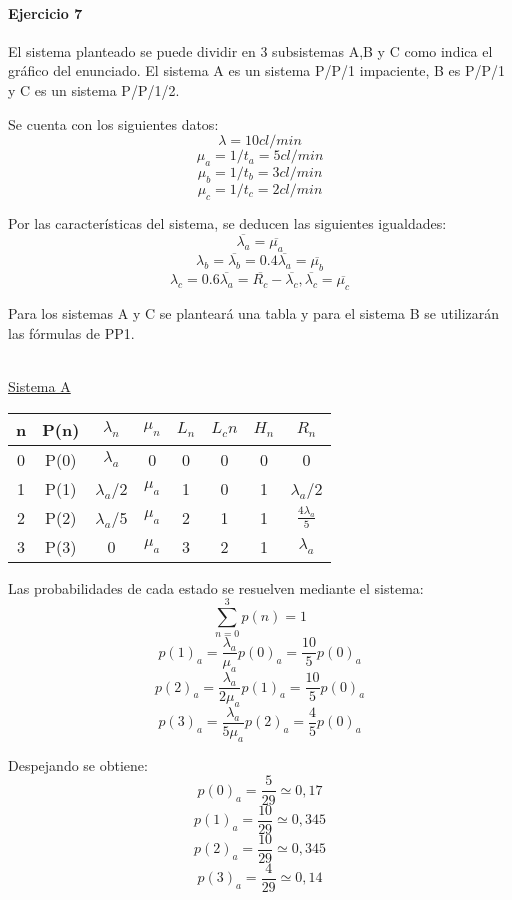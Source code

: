 \documentclass{article}
\begin{document}
\paragraph{Ejercicio 7}
  El sistema planteado se puede dividir en 3 subsistemas A,B y C como indica el gráfico del enunciado. 
  El sistema A es un sistema P/P/1 impaciente, B es P/P/1 y C es un sistema P/P/1/2.
  
  Se cuenta con los siguientes datos: \\
  $$ \lambda = 10 cl/min $$
  $$ \mu_a = 1/t_a = 5 cl/min $$
  $$ \mu_b = 1/t_b = 3 cl/min $$
  $$ \mu_c = 1/t_c = 2 cl/min $$
 
  Por las características del sistema, se deducen las siguientes igualdades: \\
  $$ \overline{\lambda_a} = \overline{\mu_a}$$
  $$ \lambda_b = \overline{\lambda_b} = 0.4 \overline{\lambda_a} = \overline{\mu_b}$$
  $$ \lambda_c = 0.6 \overline{\lambda_a} = \overline{R_c} - \overline{\lambda_c} , \overline{\lambda_c} = \overline{\mu_c}$$
  
 Para los sistemas A y C se planteará una tabla y para el sistema B se utilizarán las fórmulas de PP1. \\ \\

 \begin{center}
  \underline{Sistema A} \\ 
    \begin{tabular}{|| c | c | c | c | c | c | c | c ||}
    \hline 
     n & P(n) & $\lambda_n$ & $\mu_n$ & $L_n$& $L_cn$ & $H_n$ & $R_n$ 			\\ \hline \hline
     0 & P(0) & $\lambda_a$   & 0       & 0    & 0      & 0     & 0			\\ \hline
     1 & P(1) & $\lambda_a$/2 & $\mu_a$ & 1    & 0      & 1     & $\lambda_a$/2		\\ \hline
     2 & P(2) & $\lambda_a$/5 & $\mu_a$ & 2    & 1      & 1     & $\frac{4\lambda_a}{5}$	\\ \hline
     3 & P(3) &  0            & $\mu_a$ & 3    & 2      & 1     & $\lambda_a$ 		\\ \hline
     
    \end{tabular}
    
    Las probabilidades de cada estado se resuelven mediante el sistema: 
    $$ \sum_{n=0}^{3}p(n) = 1 $$
    $$ p(1)_a = \frac{\lambda_a}{\mu_a} p(0)_a = \frac{10}{5} p(0)_a $$
    $$ p(2)_a = \frac{\lambda_a}{2\mu_a} p(1)_a = \frac{10}{5} p(0)_a$$
    $$ p(3)_a = \frac{\lambda_a}{5\mu_a} p(2)_a = \frac{4}{5} p(0)_a$$
    
    Despejando se obtiene: 
    $$ p(0)_a = \frac{5}{29} \simeq 0,17 $$
    $$ p(1)_a = \frac{10}{29} \simeq 0,345 $$
    $$ p(2)_a = \frac{10}{29} \simeq 0,345 $$
    $$ p(3)_a = \frac{4}{29} \simeq 0,14 $$
    
  \end{center} 
  
\end{document}
